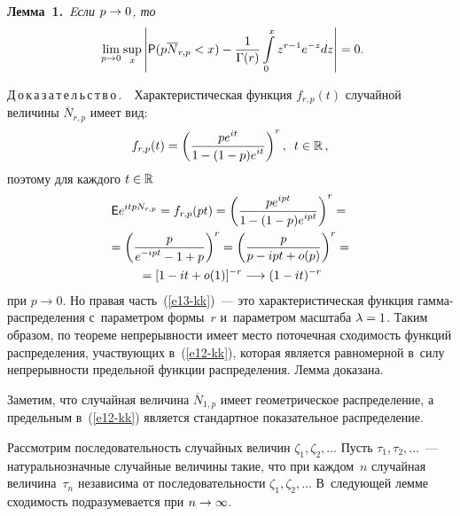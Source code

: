 \begin{multicols}{2}
\smallskip

\noindent
\textbf{Лемма~1.}\ \textit{Eсли $p\hm\to0$, то}
\begin{equation}
\hspace*{-1mm}\lim\limits_{p\to 0}\sup\limits_x\left\vert {\sf P}(p\overline
N_{r,p}<x)-\displaystyle\frac{\displaystyle 1\mathstrut}{\displaystyle \Gamma(r)\mathstrut}\int\limits_{0}^{x}z^{r-1}e^{-z}dz\right\vert =0.\!\!\!\!
\label{e12-kk}
\end{equation}

\smallskip

\noindent
Д\,о\,к\,а\,з\,а\,т\,е\,л\,ь\,с\,т\,в\,о\,.\ \ Характеристическая функция $f_{r,p}(t)$
случайной величины $\overline N_{r,p}$ имеет вид:
$$
f_{r,p}(t)=\left(\displaystyle\frac{\displaystyle pe^{it}\mathstrut}{\displaystyle 1-(1-p)e^{it}\mathstrut}\right)^r,\enskip
t\in\mathbb{R}\,,
$$
поэтому для каждого $t\hm\in\mathbb{R}$
\begin{multline}
{\sf
E}e^{itpN_{r,p}}=f_{r,p}(pt)=\left(\displaystyle\frac{\displaystyle pe^{ipt}\mathstrut}{\displaystyle 1-(1-p)e^{ipt}\mathstrut}\right)^r={}\\
{}=
\left(\displaystyle\frac{\displaystyle p\mathstrut}{\displaystyle e^{-ipt}-1+p\mathstrut}\right)^r=\left(\displaystyle\frac{\displaystyle p\mathstrut}{\displaystyle p-ipt+o(p)\mathstrut}\right)^r={}
\\
{}=[1-it+o(1)]^{-r}\longrightarrow (1-it)^{-r}\label{e13-kk}
\end{multline}
при $p\to 0$. Но правая часть~(\ref{e13-kk})~--- это характеристическая функция
гам\-ма-рас\-пре\-де\-ле\-ния с~параметром формы~$r$ и~параметром масштаба
$\lambda\hm=1$. Таким образом, по теореме непрерывности имеет место
поточечная сходимость функций распределения, участвующих в~(\ref{e12-kk}),
которая является равномерной в~силу непрерывности предельной функции
распределения. Лемма доказана.

\smallskip

Заметим, что случайная величина $\overline N_{1,p}$ имеет
геометрическое распределение, а предельным в~(\ref{e12-kk}) является
стандартное показательное распределение.

Рассмотрим последовательность случайных величин
$\zeta_1,\zeta_2,\ldots$ Пусть $\tau_1,\tau_2,\ldots$~---
на\-ту\-раль\-но\-знач\-ные случайные величины такие, что при каждом~$n$ 
случайная величина~$\tau_n$ независима от последовательности
$\zeta_1,\zeta_2,\ldots$ В~следующей лемме сходимость подразумевается
при $n\hm\to\infty$.

\smallskip


\end{multicols}
